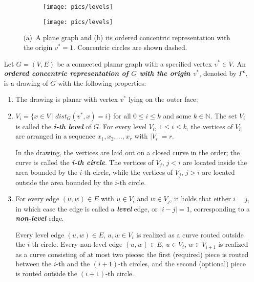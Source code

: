 \documentclass[orivec]{llncs}
\newcommand{\dfb}[1]{{\it \bf #1}}
\begin{document}
\begin{figure}[t]
    \centering
    \begin{subfigure}[b]{.48\linewidth}
        \texttt{[image: pics/levels]}
        \caption{}
        \label{fig:cr1}
    \end{subfigure}
\hfill
    \begin{subfigure}[b]{.48\linewidth}
        \texttt{[image: pics/levels]}
        \caption{}
        \label{fig:cr2}
    \end{subfigure}
    \caption{(a)~A plane graph and (b) its ordered concentric representation with the origin $v^*=1$.
    Concentric circles are shown dashed.}
    \label{fig:cr}
\end{figure}

\begin{definition}
    \label{def:con}
    Let $G=(V, E)$ be a connected planar graph with a specified vertex $v^* \in V$. An \dfb{ordered concentric
    representation of $G$ with the origin $v^*$}, denoted by $\Gamma^o$, is a drawing of $G$ with the following properties:

\begin{enumerate}[label={(\roman*)}]
    \item The drawing is planar with vertex $v^*$ lying on the outer face;
    
    \item $V_i = \{x \in V~|~dist_{G}(v^*, x) = i\}$ for all $0 \le i \le k$ and some $k \in \mathbb{N}$.
    The set $V_i$ is called the \dfb{\emph{i}-th level} of $G$. For every level $V_i$, $1 \le i \le k$, 
    the vertices of $V_i$ are arranged in
    a sequence $x_1, x_2, \dots ,x_r$ with $|V_i| = r$. 
    
    In the drawing, the vertices are 
    laid out on a closed curve in the order; the curve is called the \dfb{\emph{i}-th circle}.
    The vertices of $V_j$, $j < i$ are located inside the area bounded by the $i$-th circle,
    while the vertices of $V_j$, $j > i$ are located outside the area bounded by the $i$-th circle.

    
    \item For every edge $(u, w) \in E$ with $u \in V_i$ and $w \in V_j$, it holds that either $i=j$,
    in which case the edge is called a \dfb{level} edge, or $|i-j|=1$, corresponding to a \dfb{non-level} edge.
    
    Every level edge $(u, w) \in E$, $u, w \in V_i$ is realized as a curve routed outside the $i$-th circle.
    Every non-level edge $(u, w) \in E$, $u \in V_i$, $w \in V_{i+1}$ is realized as a curve consisting of
    at most two pieces: the first (required) piece is routed between the $i$-th and the $(i+1)$-th circles, and
    the second (optional) piece is routed outside the $(i+1)$-th circle.
\end{enumerate}    
\end{definition}    
\end{document}

